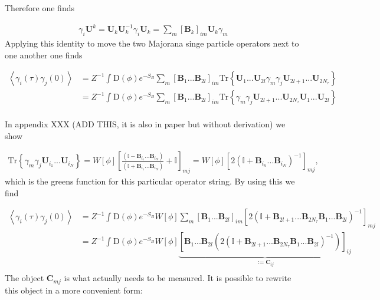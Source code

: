\documentclass{article}
\begin{document}
Therefore one finds

\begin{align}
	\gamma_{i}\boldsymbol{U}^{k} = \boldsymbol{U}^{}_{k}\boldsymbol{U}_{k}^{-1} \gamma_{i}\boldsymbol{U}_{k} = \sum_{m}^{ } \left[\boldsymbol{B}_{k}\right]_{im}  \boldsymbol{U}_{k} \gamma_{m}    
\end{align}
Applying this identity to move the two Majorana singe particle operators next to one another one finds

\begin{align}
	\left< \gamma_{i}(\tau) \gamma_j(0)\right> &= Z^{-1}\int_{}^{ } \mathrm{D}\left(\phi\right)e^{-S_{B}} \sum_{m}^{ }\left[ \boldsymbol{B}_{1}...\boldsymbol{B}_{2l}  \right]_{im} \mathrm{Tr}\left\{ \boldsymbol{U}_{1}...\boldsymbol{U}_{2l}\gamma_{m}\gamma_{j}\boldsymbol{U}_{2l+1}...\boldsymbol{U}_{2N_{\tau} }   \right\} \nonumber \\
	&=    Z^{-1}\int_{ }^{ } \mathrm{D}\left(\phi\right)e^{-S_{B}} \sum_{m}^{ }\left[ \boldsymbol{B}_{1}...\boldsymbol{B}_{2l}  \right]_{im} \mathrm{Tr}\left\{ \gamma_{m}\gamma_{j}\boldsymbol{U}_{2l+1}...\boldsymbol{U}_{2N_{\tau} }\boldsymbol{U}_{1}...\boldsymbol{U}_{2l}   \right\} \nonumber \\
\end{align}

In appendix XXX (ADD THIS, it is also in paper but without derivation) we show

\begin{align}
	\mathrm{Tr}\left\{ \gamma_{m}\gamma_{j}\boldsymbol{U}_{i_1}...\boldsymbol{U}_{i_N}   \right\} = W\left[ \phi \right]  \left[\frac{\left(\mathbb{I} - \boldsymbol{B}_{i_1}...\boldsymbol{B}_{i_N}\right) }{ \left(\mathbb{I} + \boldsymbol{B}_{i_1}...\boldsymbol{B}_{i_N}\right)  } + \mathbb{I}\right]_{mj}   = W\left[ \phi \right] \left[2\left(\mathbb{I} + \boldsymbol{B}_{i_n}...\boldsymbol{B}_{i_N}\right)^{-1}\right]_{mj},
\end{align}
which is the greens function for this particular operator string. By using this we find

\begin{align}
	\left< \gamma_{i}(\tau) \gamma_j(0)\right> &= Z^{-1}\int_{ }^{ } \mathrm{D}\left(\phi\right)e^{-S_{B}} W\left[ \phi \right] \sum_{m}^{ }\left[ \boldsymbol{B}_{1}...\boldsymbol{B}_{2l}  \right]_{im}  \left[2\left(\mathbb{I} + \boldsymbol{B}_{2l+1}...\boldsymbol{B}_{2N_{\tau} }\boldsymbol{B}_{1}...\boldsymbol{B}_{2l} \right)^{-1} \right] _{mj} \nonumber \\
	&= Z^{-1}\int_{ }^{ } \mathrm{D}\left(\phi\right)e^{-S_{B}} W\left[ \phi \right]  \underbrace{\left[  \boldsymbol{B}_{1}...\boldsymbol{B}_{2l}\left(2\left(\mathbb{I} + \boldsymbol{B}_{2l+1}...\boldsymbol{B}_{2N_{\tau} }\boldsymbol{B}_{1}...\boldsymbol{B}_{2l} \right)^{-1} \right)\right]_{ij}}_{:= \boldsymbol{C} _{ij} }  \nonumber \\
\end{align}
The object $\boldsymbol{C}_{mj} $ is what actually needs to be measured. It is possible to rewrite this object in a more convenient form:
\end{document}
